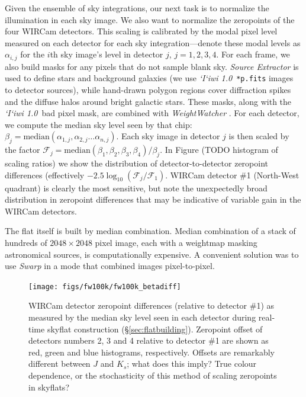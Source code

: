 \documentclass[iop]{emulateapj}
\newcommand{\sw}[1]{\textit{#1}} %
\newcommand{\iiwione}{\sw{`I`iwi 1.0}}
\newcommand{\todo}[1]{\textcolor{RedOrange}{#1}} %
\newcommand{\Sec}[1]{\S\ref{sec:#1}}  %
\begin{document}
Given the ensemble of sky integrations, our next task is to normalize the illumination in each sky image.
We also want to normalize the zeropoints of the four WIRCam detectors.
This scaling is calibrated by the modal pixel level measured on each detector for each sky integration---denote these modal levels as $\alpha_{i,j}$ for the $i$th sky image's level in detector $j$, $j=1, 2, 3, 4$.
For each frame, we also build masks for any pixels that do not sample blank sky. \sw{Source Extractor} \citep{Bertin:1996} is used to define stars and background galaxies (we use \iiwione\ \texttt{*p.fits} images to detector sources), while hand-drawn polygon regions cover diffraction spikes and the diffuse halos around bright galactic stars. These masks, along with the \iiwione\ bad pixel mask, are combined with \sw{WeightWatcher} \citep{Marmo:2008}.
For each detector, we compute the median sky level seen by that chip: $\beta_j = \mathrm{median}(\alpha_{1,j}, \alpha_{2,j}\ldots \alpha_{n,j} )$.
Each sky image in detector $j$ is then scaled by the factor $\mathcal{F}_j = \mathrm{median}(\beta_1, \beta_2, \beta_3, \beta_4) / \beta_j$.
In Figure (\todo{TODO histogram of scaling ratios}) we show the distribution of detector-to-detector zeropoint differences (effectively $-2.5 \log_{10}(\mathcal{F}_j / \mathcal{F}_1)$.
WIRCam detector \#1 (North-West quadrant) is clearly the most sensitive, but note the unexpectedly broad distribution in zeropoint differences that may be indicative of variable gain in the WIRCam detectors.

The flat itself is built by median combination. Median combination of a stack of hundreds of $2048\times2048$ pixel image, each with a weightmap masking astronomical sources, is computationally expensive. A convenient solution was to use \sw{Swarp} \citep[an image-mosaicing software package,][]{Bertin:2002} in a mode that combined images pixel-to-pixel.

\begin{figure}[t]
\centering
\texttt{[image: figs/fw100k/fw100k\_betadiff]}
\caption{WIRCam detector zeropoint differences (relative to detector \#1) as measured by the median sky level seen in each detector during real-time skyflat construction (\Sec{flatbuilding}).
Zeropoint offset of detectors numbers 2, 3 and 4 relative to detector \#1 are shown as red, green and blue histograms, respectively.
\todo{Offsets are remarkably different between $J$ and $K_s$; what does this imply? True colour dependence, or the stochasticity of this method of scaling zeropoints in skyflats?}}
\label{fig:fw100k_betadiff}
\end{figure}
\end{document}
